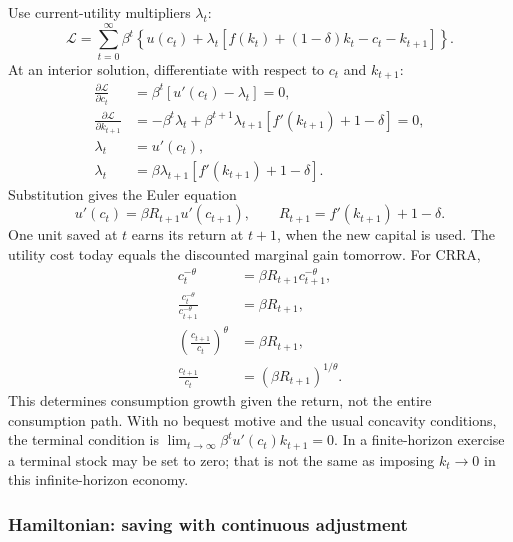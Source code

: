 Use current-utility multipliers $\lambda_t$:
\begin{equation}
\mathscr L=\sum_{t=0}^\infty\beta^t
\left\{u(c_t)+\lambda_t[f(k_t)+(1-\delta)k_t-c_t-k_{t+1}]\right\}.
\end{equation}
At an interior solution, differentiate with respect to $c_t$ and $k_{t+1}$:
\begin{align}
\frac{\partial\mathscr L}{\partial c_t}
 &=\beta^t[u'(c_t)-\lambda_t]=0,\\
\frac{\partial\mathscr L}{\partial k_{t+1}}
 &=-\beta^t\lambda_t
   +\beta^{t+1}\lambda_{t+1}[f'(k_{t+1})+1-\delta]=0,\\
\lambda_t&=u'(c_t),\\
\lambda_t&=\beta\lambda_{t+1}[f'(k_{t+1})+1-\delta].
\end{align}
Substitution gives the Euler equation
\begin{equation}\label{eq:ramsey-discrete-euler}
u'(c_t)=\beta R_{t+1}u'(c_{t+1}),\qquad
R_{t+1}=f'(k_{t+1})+1-\delta.
\end{equation}
One unit saved at $t$ earns its return at $t+1$, when the new capital is used.
The utility cost today equals the discounted marginal gain tomorrow. For CRRA,
\begin{align}
c_t^{-\theta}&=\beta R_{t+1}c_{t+1}^{-\theta},\\
\frac{c_t^{-\theta}}{c_{t+1}^{-\theta}}&=\beta R_{t+1},\\
\left(\frac{c_{t+1}}{c_t}\right)^\theta&=\beta R_{t+1},\\
\frac{c_{t+1}}{c_t}&=(\beta R_{t+1})^{1/\theta}.
\end{align}
This determines consumption growth given the return, not the entire consumption
path. With no bequest motive and the usual concavity conditions, the terminal
condition is $\lim_{t\to\infty}\beta^tu'(c_t)k_{t+1}=0$. In a finite-horizon
exercise a terminal stock may be set to zero; that is not the same as imposing
$k_t\to0$ in this infinite-horizon economy.

\subsubsection{Hamiltonian: saving with continuous adjustment}\label{method-of-hamiltonian-equation-optimal-control}

